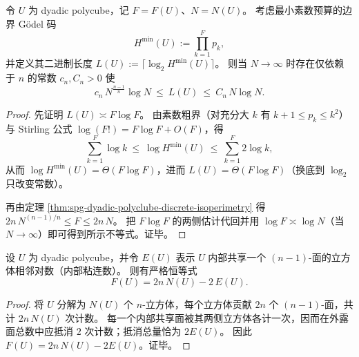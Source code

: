 \begin{theorem}\label{thm:spg-boundary-godel-bitcomplexity-isoperimetric}
令 \(U\) 为 dyadic polycube，记 \(F=F(U)\)、\(N=N(U)\)。
考虑最小素数预算的边界 Gödel 码
\[
H^{\min}(U):=\prod_{k=1}^{F} p_k,
\]
并定义其二进制长度 \(L(U):=\lceil\log_2 H^{\min}(U)\rceil\)。
则当 \(N\to\infty\) 时存在仅依赖于 \(n\) 的常数 \(c_n,C_n>0\) 使
\[
c_n\,N^{\frac{n-1}{n}}\log N\ \le\ L(U)\ \le\ C_n\,N\log N.
\]
\end{theorem}
\begin{proof}
先证明 \(L(U)\asymp F\log F\)。
由素数粗界（对充分大 \(k\) 有 \(k+1\le p_k\le k^2\)）与 Stirling 公式 \(\log(F!)=F\log F+O(F)\)，得
\[
\sum_{k=1}^{F}\log k\ \le\ \log H^{\min}(U)\ \le\ \sum_{k=1}^{F}2\log k,
\]
从而 \(\log H^{\min}(U)=\Theta(F\log F)\)，进而 \(L(U)=\Theta(F\log F)\)（换底到 \(\log_2\) 只改变常数）。
\par
再由定理 \ref{thm:spg-dyadic-polyclube-discrete-isoperimetry} 得 \(2n\,N^{(n-1)/n}\le F\le 2n\,N\)。
把 \(F\log F\) 的两侧估计代回并用 \(\log F\asymp \log N\)（当 \(N\to\infty\)）即可得到所示不等式。证毕。
\end{proof}

\begin{proposition}[边界面数与内部粘连数的精确恒等式]\label{prop:spg-dyadic-polyclube-boundary-vs-adjacency-identity}
设 \(U\) 为 dyadic polycube，并令 \(E(U)\) 表示 \(U\) 内部共享一个 \((n-1)\)-面的立方体相邻对数（内部粘连数）。
则有严格恒等式
\[
F(U)=2n\,N(U)-2\,E(U).
\]
\end{proposition}
\begin{proof}
将 \(U\) 分解为 \(N(U)\) 个 \(n\)-立方体，每个立方体贡献 \(2n\) 个 \((n-1)\)-面，共计 \(2n\,N(U)\) 次计数。
每一个内部共享面被其两侧立方体各计一次，因而在外露面总数中应抵消 \(2\) 次计数；抵消总量恰为 \(2E(U)\)。
因此 \(F(U)=2n\,N(U)-2E(U)\)。证毕。
\end{proof}



\endinput
